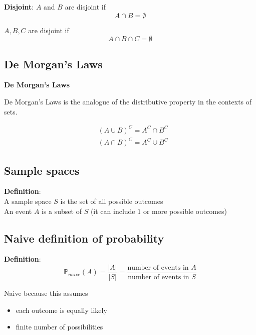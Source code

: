 \begin{framed}
   \textbf{Disjoint}: $A$ and $B$ are disjoint if
   \[
     A \cap B = \emptyset
   \] 

   $A, B, C$ are disjoint if \[
     A \cap B \cap C = \emptyset
   \] 
\end{framed}

\subsection{De Morgan's Laws}
\begin{framed}
\textbf{De Morgan's Laws}

De Morgan's Laws is the analogue of the distributive property in the contexts of sets. 

\begin{align*}
   & (A \cup B)^C = A^C \cap B^C \\
   & (A \cap B)^C = A^C \cup B^C
\end{align*}
\end{framed}

\subsection{Sample spaces}
\begin{framed}

 \textbf{Definition}:  \\
 A sample space $S$ is the set of all possible outcomes\\ 

 An event $A$  is a subset of $S$ (it can include $1$ or more possible outcomes) \\

  
\end{framed}

\subsection{Naive definition of probability}

\begin{framed}
   \textbf{Definition}: 
   \[
      \mathbb{P}_{naive}(A) = \frac{|A|}{|S|} =  \frac{
        \text{number of events in $A$}
     }{
        \text{number of events in $S$}
     }
   \] 
   
   Naive because this assumes
   \begin{itemize}
      \item each outcome is equally likely
      \item finite number of possibilities
   \end{itemize}
\end{framed}







